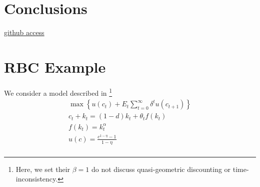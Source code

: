 \documentclass[12pt]{article}
\begin{document}
\section{Conclusions}
\begin{description}
\item[\href{https://github.com/es335mathwiz/AMASeriesRepresentation.git}{github access}] 
\end{description}
\label{sec:conc}






\appendix


\section{RBC Example}
\label{sec:rbc-example-1}

  We consider a model described in \cite{Maliar2005}\footnote{Here, we set their $\beta=1$ do not discuss quasi-geometric discounting or time-inconsistency.}
 \begin{gather*}
   \max\left \{  u(c_t) + E_t \sum_{t=0}^\infty  \delta^{t}u(c_{t+1})\right \}\\
c_t + k_t=(1-d)k_t + \theta_t f(k_t)\\
f(k_t)= k_t^\alpha\\
u(c)=\frac{c^{1-\eta}-1}{1-\eta}\\
 \end{gather*}
\end{document}
